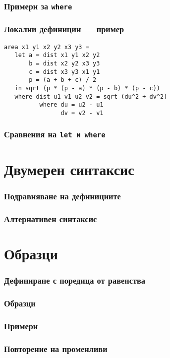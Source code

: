 \documentclass{beamer}
\begin{document}
\begin{frame}
  \frametitle{Примери за \tt{where}}
  
\end{frame}

\begin{frame}[fragile]
  \frametitle{Локални дефиниции --- пример}
\begin{verbatim}
area x1 y1 x2 y2 x3 y3 =
   let a = dist x1 y1 x2 y2
       b = dist x2 y2 x3 y3
       c = dist x3 y3 x1 y1
       p = (a + b + c) / 2
   in sqrt (p * (p - a) * (p - b) * (p - c))
   where dist u1 v1 u2 v2 = sqrt (du^2 + dv^2)
          where du = u2 - u1
                dv = v2 - v1
\end{verbatim}
\end{frame}

\begin{frame}
  \frametitle{Сравнения на \tt{let} и \tt{where}}
  
\end{frame}

\section{Двумерен синтаксис}

\begin{frame}
  \frametitle{Подравняване на дефинициите}

\end{frame}

\begin{frame}
  \frametitle{Алтернативен синтаксис}
  
\end{frame}

\section{Образци}

\begin{frame}
  \frametitle{Дефиниране с поредица от равенства}
  
\end{frame}

\begin{frame}
  \frametitle{Образци}
  
\end{frame}

\begin{frame}
  \frametitle{Примери}
  
\end{frame}

\begin{frame}
  \frametitle{Повторение на променливи}
  
\end{frame}
\end{document}
